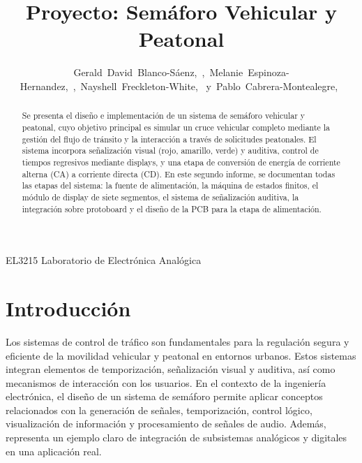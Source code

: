 \documentclass[12pt, journal, onecolumn]{IEEEtran}
\begin{document}
\title{Proyecto: Semáforo Vehicular y Peatonal}
	
	
\author{Gerald~David~Blanco-Sáenz,~,~Melanie~Espinoza-Hernandez,~,~Nayshell~Freckleton-White,~ 
	y~Pablo~Cabrera-Montealegre,~}
	
	
%
{EL3215 Laboratorio de Electrónica Analógica}
	
	
\maketitle
	
\begin{abstract}
		Se presenta el diseño e implementación de un sistema de semáforo vehicular y peatonal, cuyo objetivo principal es simular un cruce vehicular completo mediante la gestión del flujo de tránsito y la interacción a través de solicitudes peatonales. El sistema incorpora señalización visual (rojo, amarillo,
verde) y auditiva, control de tiempos regresivos mediante displays, y una etapa de conversión de energía de corriente alterna (CA) a corriente directa (CD). En este segundo informe, se documentan todas las etapas del sistema: la fuente de alimentación, la máquina de estados finitos, el módulo de display de siete segmentos, el sistema de señalización auditiva, la integración sobre protoboard y el diseño de la PCB para la etapa de alimentación.
\end{abstract}
	
\section{Introducción}
	Los sistemas de control de tráfico son fundamentales para la regulación segura y eficiente de la movilidad vehicular y peatonal en entornos urbanos. Estos sistemas integran elementos de temporización, señalización visual y auditiva, así como mecanismos de interacción con los usuarios. En el contexto de la ingeniería electrónica, el diseño de un sistema de semáforo permite aplicar conceptos relacionados con la generación de señales, temporización, control lógico, visualización de información y procesamiento de señales de audio. Además, representa un ejemplo claro de integración de subsistemas analógicos y digitales en una aplicación real. \\
	
\end{document}
